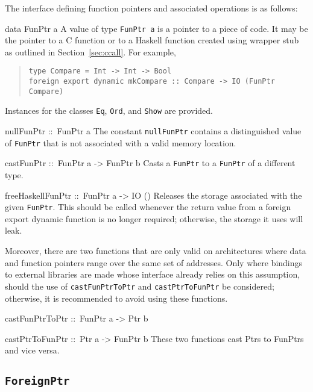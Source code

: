 \documentclass[a4paper,twosides]{article}
\makeatletter
\newcommand{\code}[1]{\texttt{#1}}      %
\newenvironment{codedesc}{%
  \list{}{\labelwidth\z@
    \let\makelabel\codedesclabel}
  }{%
  \endlist
  }
\newcommand*{\codedesclabel}[1]{%
  \hspace{-\leftmargin}
  \parbox[b]{\labelwidth}{\makebox[0pt][l]{\code{#1}}\\}\hfil\relax
  }
\newcommand{\combineitems}{\vspace*{-\itemsep}\vspace*{-\parsep}\vspace*{-1em}}
\makeatother
\begin{document}
The interface defining function pointers and associated operations is as
follows:
%
\begin{codedesc}
\item[data FunPtr a] A value of type \code{FunPtr a} is a pointer to a piece
  of code.  It may be the pointer to a C function or to a Haskell function
  created using wrapper stub as outlined in Section~\ref{sec:ccall}. For
  example,
  \begin{quote}
\begin{verbatim}
type Compare = Int -> Int -> Bool
foreign export dynamic mkCompare :: Compare -> IO (FunPtr Compare)
\end{verbatim}
  \end{quote}
  
  Instances for the classes \code{Eq}, \code{Ord}, and \code{Show} are
  provided.
\item[nullFunPtr ::\ FunPtr a] The constant \code{nullFunPtr} contains a
  distinguished value of \code{FunPtr} that is not associated with a valid
  memory location.
\item[castFunPtr ::\ FunPtr a -> FunPtr b] Casts a \code{FunPtr} to a
  \code{FunPtr} of a different type.
\item[freeHaskellFunPtr ::\ FunPtr a -> IO ()] Releases the storage associated
  with the given \code{FunPtr}. This should be called whenever the return
  value from a foreign export dynamic function is no longer required;
  otherwise, the storage it uses will leak.
\end{codedesc}

Moreover, there are two functions that are only valid on architectures where
data and function pointers range over the same set of addresses.  Only where
bindings to external libraries are made whose interface already relies on this
assumption, should the use of \code{castFunPtrToPtr} and
\code{castPtrToFunPtr} be considered; otherwise, it is recommended to avoid
using these functions.
%
\begin{codedesc}
\item[castFunPtrToPtr ::\ FunPtr a -> Ptr b]
\item[castPtrToFunPtr ::\ Ptr a -> FunPtr b] \combineitems These two functions
  cast Ptrs to FunPtrs and vice versa.
\end{codedesc}

\subsection{\code{ForeignPtr}}
\label{sec:ForeignPtr}
\end{document}
